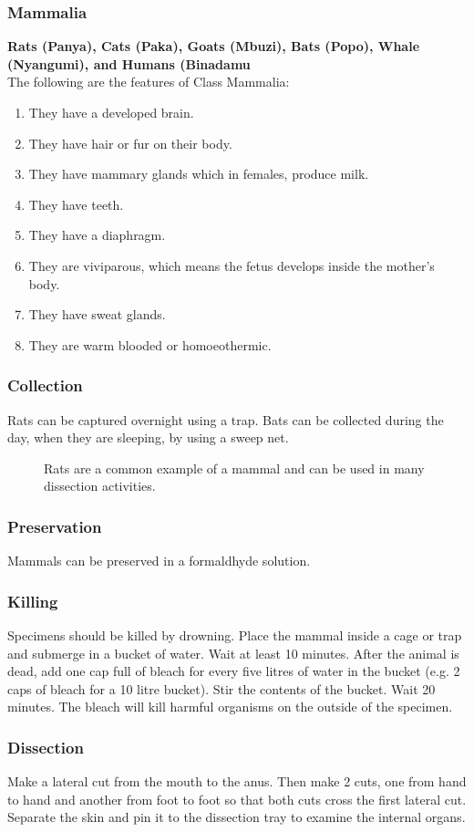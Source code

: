 \subsubsection{Mammalia} 
\textbf{Rats (Panya), Cats (Paka), Goats (Mbuzi), Bats (Popo), Whale (Nyangumi), and Humans (Binadamu}\\
The following are the features of Class Mammalia:
\begin{enumerate}
\item{They have a developed brain.}
\item{They have hair or fur on their body.}
\item{They have mammary glands which in females, produce milk.}
\item{They have teeth.}
\item{They have a diaphragm.}
\item{They are viviparous, which means the fetus develops inside the mother’s body.}
\item{They have sweat glands.}
\item{They are warm blooded or homoeothermic.}
\end{enumerate}

\subsubsection{Collection}
Rats can be captured overnight using a trap. Bats can be collected during the day, when they are sleeping, by using a sweep net.

\begin{figure}[h]
\begin{center}
\def\svgwidth{6cm}

\caption{Rats are a common example of a mammal and can be used in many dissection activities.}
\label{fig:rat}
\end{center}
\end{figure}

\subsubsection{Preservation} 
Mammals can be preserved in a formaldhyde solution.

\subsubsection{Killing}
Specimens should be killed by drowning. Place the mammal inside a cage or trap and submerge in a bucket of water. Wait at least 10 minutes. After the animal is dead, add one cap full of bleach for every five litres of water in the bucket (e.g. 2 caps of bleach for a 10 litre bucket). Stir the contents of the bucket. Wait 20 minutes. The bleach will kill harmful organisms on the outside of the specimen.

\subsubsection{Dissection}
Make a lateral cut from the mouth to the anus. Then make 2 cuts, one from hand to hand and another from foot to foot so that both cuts cross the first lateral cut. Separate the skin and pin it to the dissection tray to examine the internal organs.
